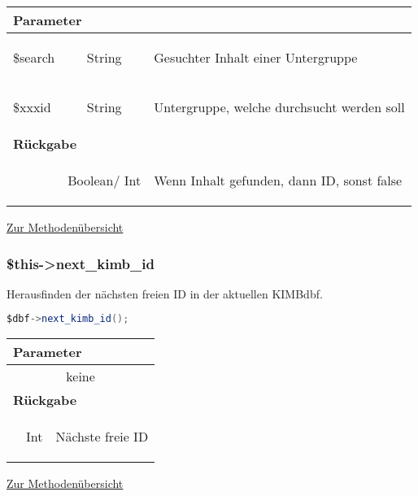 \documentclass[paper=A4,pagesize=auto,12pt,headinclude=true,footinclude=true,BCOR=0mm,DIV=calc]{scrartcl}
\begin{document}
	     \begin{tabular}{|lcp{}|}
		    \hline
		      \multicolumn{3}{|l|}{ \textbf{Parameter} } \\
		    \hline
		      \$search & String & \begin{itshape} Gesuchter Inhalt einer Untergruppe \end{itshape} \\
		      \$xxxid & String & \begin{itshape} Untergruppe, welche durchsucht werden soll \end{itshape} \\
		    \hline
		      \multicolumn{3}{|l|}{ \textbf{Rückgabe} } \\
		    \hline
			  & Boolean/ Int & \begin{itshape} Wenn Inhalt gefunden, dann ID, sonst false \end{itshape} \\
		    \hline
	    \end{tabular}
	    \begin{flushright} \small \hyperref[tab:methodenuerbersicht]{Zur Methodenübersicht} \end{flushright}
  
  \subsubsection{\$this->next\_kimb\_id}
  \label{sec:mth_id_next}
	    Herausfinden der nächsten freien ID in der aktuellen KIMBdbf. \\
	    \begin{lstlisting}[gobble=4,language=Java]
	      $dbf->next_kimb_id(); 
	    \end{lstlisting}
	    
	     \begin{tabular}{|lcp{}|}
		    \hline
		      \multicolumn{3}{|l|}{ \textbf{Parameter} } \\
		    \hline
		      \multicolumn{3}{|c|}{ keine } \\
		    \hline
		      \multicolumn{3}{|l|}{ \textbf{Rückgabe} } \\
		    \hline
			  & Int & \begin{itshape} Nächste freie ID \end{itshape} \\
		    \hline
	    \end{tabular}
	    \begin{flushright} \small \hyperref[tab:methodenuerbersicht]{Zur Methodenübersicht} \end{flushright}
  
\end{document}
